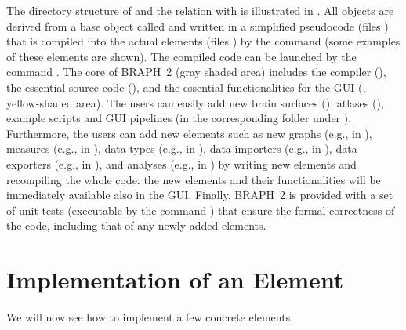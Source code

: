 \documentclass{tufte-handout}
\begin{document}
The directory structure of  and the relation with  is illustrated in .
All objects are derived from a base object called  and written in a simplified pseudocode (files ) that is compiled into the actual elements (files ) by the command  (some examples of these elements are shown).
The compiled code can be launched by the command .
The core of BRAPH~2 (gray shaded area) includes the compiler (), the essential source code (), and the essential functionalities for the GUI (, yellow-shaded area).
The users can easily add new brain surfaces (), atlases (), example scripts and GUI pipelines (in the corresponding folder under ).
Furthermore, the users can add new elements such as new graphs (e.g.,  in ), measures (e.g.,  in ), data types (e.g.,  in ), data importers (e.g.,  in ), data exporters (e.g.,  in ), and analyses (e.g.,  in ) by writing new elements and recompiling the whole code: the new elements and their functionalities will be immediately available also in the GUI.
Finally, BRAPH~2 is provided with a set of unit tests (executable by the command ) that ensure the formal correctness of the code, including that of any newly added elements.

\section{Implementation of an Element}

We will now see how to implement a few concrete elements.
\end{document}
